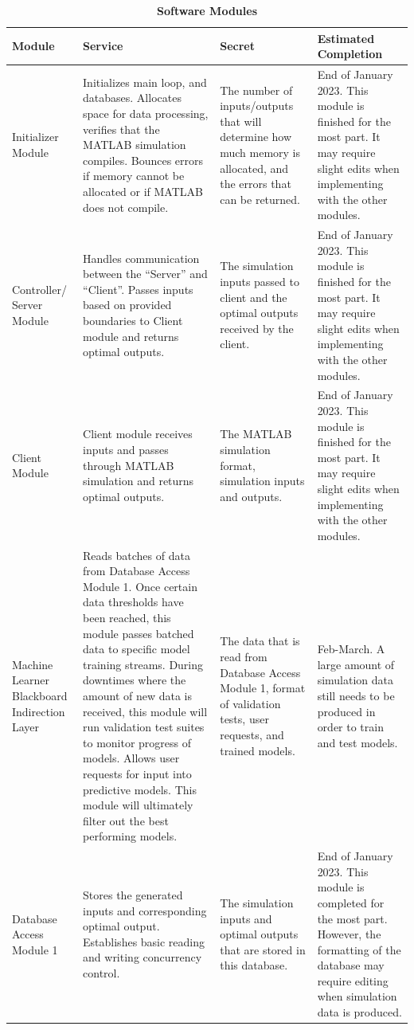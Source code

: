 \documentclass[12pt, titlepage]{article}
\begin{document}
\begin{longtable}{|p{2cm}|p{3cm}|p{3cm}|p{3cm}}
  \caption{\bf Software Modules}\\
    \hline
    \bf Module & \bf Service & \bf Secret & \bf Estimated Completion\\
    \hline
    Initializer Module & Initializes main loop, and databases.  Allocates space for data processing, verifies that the MATLAB simulation compiles. Bounces errors if memory cannot be allocated or if MATLAB does not compile.  & The number of inputs/outputs that will determine how much memory is allocated, and the errors that can be returned. & End of January 2023. This module is finished for the most part. It may require slight edits when implementing with the other modules.\\
    \hline 
    Controller/ Server Module & Handles communication between the “Server” and “Client”. Passes inputs based on provided boundaries to Client module and returns optimal outputs. & The simulation inputs passed to client and the optimal outputs received by the client. & End of January 2023. This module is finished for the most part. It may require slight edits when implementing with the other modules.\\
    \hline 
    Client Module & Client module receives inputs and passes through MATLAB simulation and returns optimal outputs. & The MATLAB simulation format, simulation inputs and outputs. & End of January 2023. This module is finished for the most part. It may require slight edits when implementing with the other modules.\\
    \hline 
    Machine Learner Blackboard Indirection Layer & Reads batches of data from Database Access Module 1. Once certain data thresholds have been reached, this module passes batched data to specific model training streams. During downtimes where the amount of new data is received, this module will run validation test suites to monitor progress of models. Allows user requests for input into predictive models. This module will ultimately filter out the best performing models. & The data that is read from Database Access Module 1, format of validation tests, user requests, and trained models. & Feb-March. A large amount of simulation data still needs to be produced in order to train and test models.\\
    \hline 
    Database Access Module 1 & Stores the generated inputs and corresponding optimal output. Establishes basic reading and writing concurrency control. & The simulation inputs and optimal outputs that are stored in this database. & End of January 2023. This module is completed for the most part. However, the formatting of the database may require editing when simulation data is produced.\\

\end{longtable}
\end{document}
